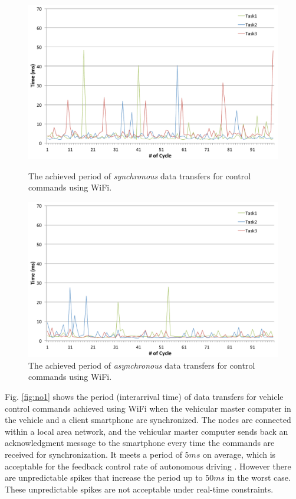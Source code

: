 \begin{figure}[!t]
 \centering
 \includegraphics[width=0.8\hsize]{fig/No1_Andrive_serv_cycle_WiFi.pdf}
 \caption{The achieved period of \textit{synchronous} data transfers for
 control commands using WiFi.}
 \label{fig:no1}
 \vspace{1em}
 \includegraphics[width=0.8\hsize]{fig/No4_Andrive_serv_cycle_WiFi_only_send.pdf}
 \caption{The achieved period of \textit{asynchronous} data transfers
 for control commands using WiFi.}
 \label{fig:no4}
\end{figure}

Fig. \ref{fig:no1} shows the period (interarrival time) of data
transfers for vehicle control commands achieved using WiFi when the
vehicular master computer in the vehicle and a client smartphone are
synchronized.
The nodes are connected within a local area network, and the vehicular
master computer sends back an acknowledgment message to the smartphone
every time the commands are received for synchronization.
It meets a period of $5ms$ on average, which is acceptable for the
feedback control rate of autonomous driving \cite{Kagami13}.
However there are unpredictable spikes that increase the period up to
$50ms$ in the worst case.
These unpredictable spikes are not acceptable under real-time
constraints.

